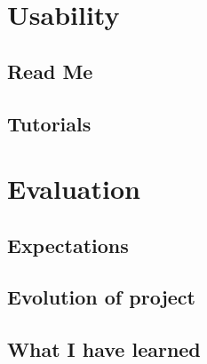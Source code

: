 \documentclass[a4paper]{report}
\begin{document}
\section{Usability}
\subsection{Read Me}
\subsection{Tutorials}

\section{Evaluation}
\subsection{Expectations}
\subsection{Evolution of project}
\subsection{What I have learned}




\end{document}

